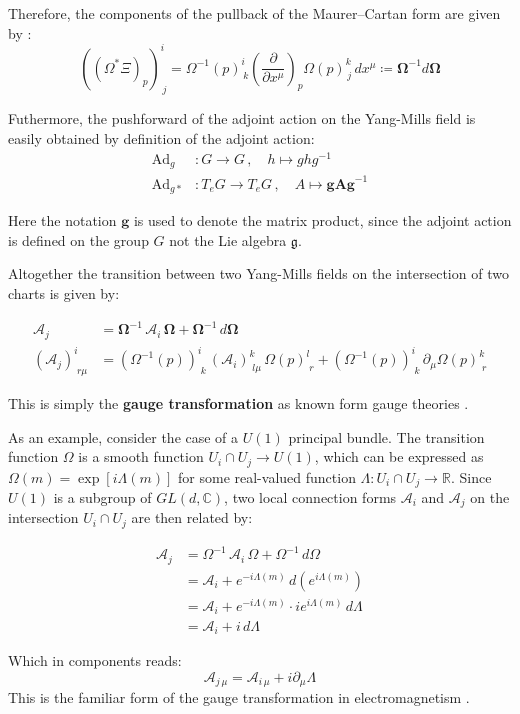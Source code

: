 Therefore, the components of the pullback of the Maurer–Cartan form are given by \cite{FredericSchullerLocalrepresentationsconnectionbasemanifoldYangMillsfieldsLec222015}:
\[
\left( (\Omega^* \Xi)_p \right)^i_{\,j} 
= \Omega^{-1}(p)^i_{\,k} \left( \frac{\partial}{\partial x^\mu} \right)_p \Omega(p)^k_{\,j} \, dx^\mu 
\coloneqq \mathbf{\Omega}^{-1} d\mathbf{\Omega}
\]



Futhermore, the pushforward of the adjoint action on the Yang-Mills field is easily obtained by definition of the adjoint action:
\begin{align*}
  \text{Ad}_g &: G \longrightarrow G \, , \quad h \mapsto ghg^{-1} \\
  \text{Ad}_{g*} &: T_eG \longrightarrow T_eG \, , \quad A \mapsto \mathbf{g A g}^{-1}
\end{align*}

Here the notation $\mathbf{g}$ is used to denote the matrix product, since the adjoint action is defined on the group $G$ not the Lie algebra $\mathfrak{g}$.

Altogether the transition between two Yang-Mills fields on the intersection of two charts is given by:

\begin{align*}
\mathbf{\mathcal{A}}_j 
&= \mathbf{\Omega}^{-1} \, \mathbf{\mathcal{A}}_i \, \mathbf{\Omega} 
  + \mathbf{\Omega}^{-1} \,  d \mathbf{\Omega} \\
(\mathcal{A}_j)^i_{\; r \mu} 
&= \left( \Omega^{-1}(p) \right)^i_{\; k} \, (\mathcal{A}_i)^k_{\; l \mu} \, \Omega(p)^l_{\; r}
+ \left( \Omega^{-1}(p) \right)^i_{\; k} \, \partial_\mu \Omega(p)^k_{\; r}
\end{align*}

This is simply the \textbf{gauge transformation} as known form gauge theories \cite{NakaharaGeometrytopologyphysics2005}.

As an example, consider the case of a $U(1)$ principal bundle. The transition function \( \Omega \) is a smooth function \( U_i \cap U_j \longrightarrow U(1) \), which can be expressed as \( \Omega(m) = \exp[i\Lambda(m)] \) for some real-valued function \( \Lambda: U_i \cap U_j \longrightarrow \mathbb{R} \). Since $U(1)$ is a subgroup of $GL(d,\mathbb{C})$, two local connection forms \( \mathcal{A}_i \) and \( \mathcal{A}_j \) on the intersection \( U_i \cap U_j \) are then related by:

\begin{align*}
  \mathcal{A}_j 
  &= \Omega^{-1} \, \mathcal{A}_i \, \Omega + \Omega^{-1} \, d\Omega \\
  &= \mathcal{A}_i + e^{-i\Lambda(m)} \, d\left( e^{i\Lambda(m)} \right) \\
  &= \mathcal{A}_i + e^{-i\Lambda(m)} \cdot i e^{i\Lambda(m)} \, d\Lambda \\
  &= \mathcal{A}_i + i \, d\Lambda
\end{align*}

Which in components reads:
\[ \mathcal{A}_{j \, \mu} = \mathcal{A}_{i \, \mu} + i\partial_\mu \Lambda \]
This is the familiar form of the gauge transformation in electromagnetism \cite{NakaharaGeometrytopologyphysics2005}.

